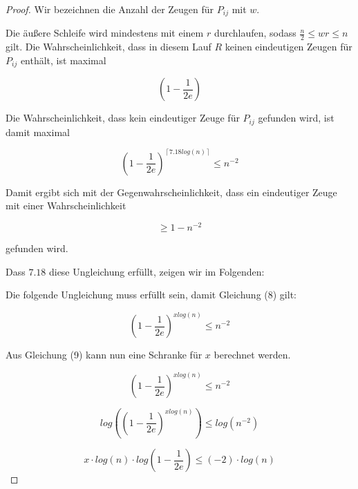 \documentclass{article}
\begin{document}
\begin{proof}
  Wir bezeichnen die Anzahl der Zeugen f{\"u}r $P_{ij}$ mit $w$.

  Die {\"a}u{\ss}ere Schleife wird mindestens mit einem $r$ durchlaufen, sodass
  $\frac{n}{2} \leq wr \leq n$ gilt. Die Wahrscheinlichkeit, dass in diesem Lauf
  $R$ keinen eindeutigen Zeugen f{\"u}r $P_{ij}$ enth{\"a}lt, ist maximal

  \begin{equation}
    \left( 1 - \frac{1}{2e} \right)
  \end{equation}

  Die Wahrscheinlichkeit, dass kein eindeutiger Zeuge f{\"u}r $P_{ij}$ gefunden
  wird, ist damit maximal
  
  \begin{equation}
    \left( 1 - \frac{1}{2e} \right)^{\left\lceil 7.18 log(n) \right\rceil} \leq n^{-2}
  \end{equation}

  Damit ergibt sich mit der Gegenwahrscheinlichkeit, dass ein eindeutiger Zeuge
  mit einer Wahrscheinlichkeit

  \begin{equation}
    \geq 1 - n^{-2}
  \end{equation}

  gefunden wird.

  Dass $7.18$ diese Ungleichung erf{\"u}llt, zeigen wir im Folgenden:

  Die folgende Ungleichung muss erf{\"u}llt sein, damit Gleichung (8) gilt:

  \begin{equation}
    \left( 1 - \frac{1}{2e} \right)^{x log(n)} \leq n^{-2}
  \end{equation}

  Aus Gleichung (9) kann nun eine Schranke f{\"u}r $x$ berechnet werden.

  \begin{equation}
    \left( 1 - \frac{1}{2e} \right)^{x log(n)} \leq n^{-2}
  \end{equation}

  \begin{equation}
    log \left( \left( 1 - \frac{1}{2e} \right)^{x log(n)} \right) \leq log \left( n^{-2} \right)
  \end{equation}

  \begin{equation}
    x \cdot log \left( n \right) \cdot log \left( 1 - \frac{1}{2e} \right) \leq (-2) \cdot log \left( n \right)
  \end{equation}


\end{proof}
\end{document}
